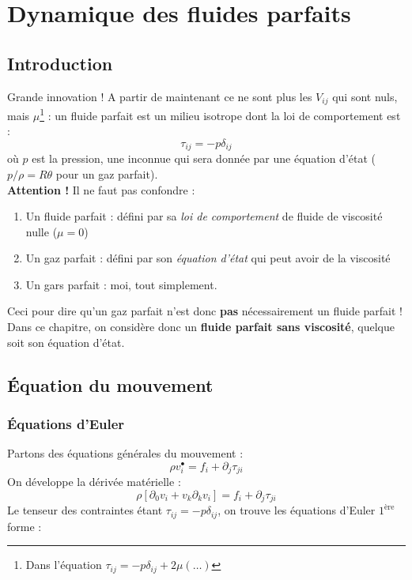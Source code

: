 \chapter{Dynamique des fluides parfaits}

\section{Introduction}
Grande innovation ! A partir de maintenant ce ne sont plus les $V_{ij}$ qui sont 
nuls, mais $\mu$\footnote{Dans l'équation $\tau_{ij} = -p\delta_{ij} + 2\mu
(\dots)$} : un fluide parfait est un milieu isotrope dont la loi de comportement 
est :
\begin{equation}
\tau_{ij} = -p\delta_{ij}
\end{equation}
où $p$ est la pression, une inconnue qui sera donnée par une équation d'état (
$p/\rho = R\theta$ pour un gaz parfait).\\
\textbf{Attention !} Il ne faut pas confondre :
\begin{enumerate}
\item Un fluide parfait : défini par sa \textit{loi de comportement} de fluide de
viscosité nulle ($\mu = 0$)
\item Un gaz parfait : défini par son \textit{équation d'état} qui peut avoir de
la viscosité
\item Un gars parfait : moi, tout simplement.
\end{enumerate}
Ceci pour dire qu'un gaz parfait n'est donc \textbf{pas} nécessairement un fluide
parfait ! Dans ce chapitre, on considère donc un \textbf{fluide parfait sans 
viscosité}, quelque soit son équation d'état.


\section{Équation du mouvement}
	\subsection{Équations d'Euler}
	Partons des équations générales du mouvement :
	\begin{equation}
	\rho v_i^\bullet = f_i + \partial_j \tau_{ji}
	\end{equation}
	On développe la dérivée matérielle :
	\begin{equation}
	\rho[\partial_0v_i + v_k\partial_kv_i] = f_i + \partial_j\tau_{ji}
	\end{equation}
	Le tenseur des contraintes étant $\tau_{ij} = -p\delta_{ij}$, on trouve les
	équations d'Euler $1^{\text{ère}}$ forme :\\
	
